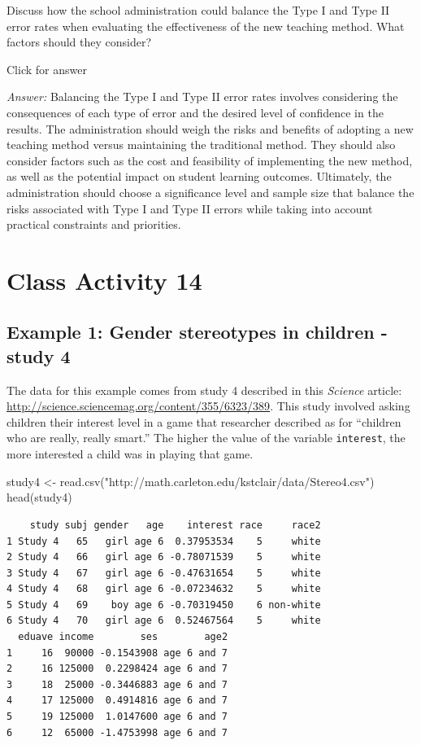 \documentclass[
]{book}
\newenvironment{Shaded}{\begin{snugshade}}{\end{snugshade}}
\newcommand{\FunctionTok}[1]{\textcolor[rgb]{0.00,0.00,0.00}{#1}}
\newcommand{\NormalTok}[1]{#1}
\newcommand{\OtherTok}[1]{\textcolor[rgb]{0.56,0.35,0.01}{#1}}
\newcommand{\StringTok}[1]{\textcolor[rgb]{0.31,0.60,0.02}{#1}}
\begin{document}
Discuss how the school administration could balance the Type I and Type II error rates when evaluating the effectiveness of the new teaching method. What factors should they consider?

Click for answer

\emph{Answer:} Balancing the Type I and Type II error rates involves considering the consequences of each type of error and the desired level of confidence in the results. The administration should weigh the risks and benefits of adopting a new teaching method versus maintaining the traditional method. They should also consider factors such as the cost and feasibility of implementing the new method, as well as the potential impact on student learning outcomes. Ultimately, the administration should choose a significance level and sample size that balance the risks associated with Type I and Type II errors while taking into account practical constraints and priorities.

\hypertarget{class-activity-14}{%
\chapter{Class Activity 14}\label{class-activity-14}}

\hypertarget{example-1-gender-stereotypes-in-children---study-4}{%
\section{Example 1: Gender stereotypes in children - study 4}\label{example-1-gender-stereotypes-in-children---study-4}}

The data for this example comes from study 4 described in this \emph{Science} article: \url{http://science.sciencemag.org/content/355/6323/389}. This study involved asking children their interest level in a game that researcher described as for ``children who are really, really smart.'' The higher the value of the variable \texttt{interest}, the more interested a child was in playing that game.

\begin{Shaded}
\begin{Highlighting}[]
\NormalTok{study4 }\OtherTok{\textless{}{-}} \FunctionTok{read.csv}\NormalTok{(}\StringTok{"http://math.carleton.edu/kstclair/data/Stereo4.csv"}\NormalTok{)}
\FunctionTok{head}\NormalTok{(study4)}
\end{Highlighting}
\end{Shaded}

\begin{verbatim}
    study subj gender   age    interest race     race2
1 Study 4   65   girl age 6  0.37953534    5     white
2 Study 4   66   girl age 6 -0.78071539    5     white
3 Study 4   67   girl age 6 -0.47631654    5     white
4 Study 4   68   girl age 6 -0.07234632    5     white
5 Study 4   69    boy age 6 -0.70319450    6 non-white
6 Study 4   70   girl age 6  0.52467564    5     white
  eduave income        ses        age2
1     16  90000 -0.1543908 age 6 and 7
2     16 125000  0.2298424 age 6 and 7
3     18  25000 -0.3446883 age 6 and 7
4     17 125000  0.4914816 age 6 and 7
5     19 125000  1.0147600 age 6 and 7
6     12  65000 -1.4753998 age 6 and 7
\end{verbatim}
\end{document}
